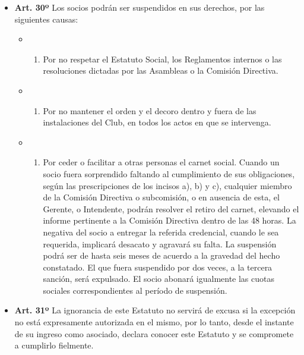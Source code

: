 \documentclass[]{book}
\providecommand{\tightlist}{%
  \setlength{\itemsep}{0pt}\setlength{\parskip}{0pt}}
\begin{document}
\begin{itemize}
\tightlist
\item
  \textbf{Art. 30º}
  Los socios podrán ser suspendidos en sus derechos, por las siguientes causas:

  \begin{itemize}
  \item
    \begin{enumerate}
    \def\labelenumi{\alph{enumi})}
    \tightlist
    \item
      Por no respetar el Estatuto Social, los Reglamentos internos o las resoluciones dictadas por las Asambleas o la Comisión Directiva.
    \end{enumerate}
  \item
    \begin{enumerate}
    \def\labelenumi{\alph{enumi})}
    \setcounter{enumi}{1}
    \tightlist
    \item
      Por no mantener el orden y el decoro dentro y fuera de las instalaciones del Club, en todos los actos en que se intervenga.
    \end{enumerate}
  \item
    \begin{enumerate}
    \def\labelenumi{\alph{enumi})}
    \setcounter{enumi}{2}
    \tightlist
    \item
      Por ceder o facilitar a otras personas el carnet social. Cuando un socio fuera sorprendido faltando al cumplimiento de sus obligaciones, según las prescripciones de los incisos a), b) y c), cualquier miembro de la Comisión Directiva o subcomisión, o en ausencia de esta, el Gerente, o Intendente, podrán resolver el retiro del carnet, elevando el informe pertinente a la Comisión Directiva dentro de las 48 horas. La negativa del socio a entregar la referida credencial, cuando le sea requerida, implicará desacato y agravará su falta. La suspensión podrá ser de hasta seis meses de acuerdo a la gravedad del hecho constatado. El que fuera suspendido por dos veces, a la tercera sanción, será expulsado. El socio abonará igualmente las cuotas sociales correspondientes al período de suspensión.
    \end{enumerate}
  \end{itemize}
\end{itemize}

\begin{itemize}
\tightlist
\item
  \textbf{Art. 31º}
  La ignorancia de este Estatuto no servirá de excusa si la excepción no está expresamente autorizada en el mismo, por lo tanto, desde el instante de su ingreso como asociado, declara conocer este Estatuto y se compromete a cumplirlo fielmente.
\end{itemize}
\end{document}
